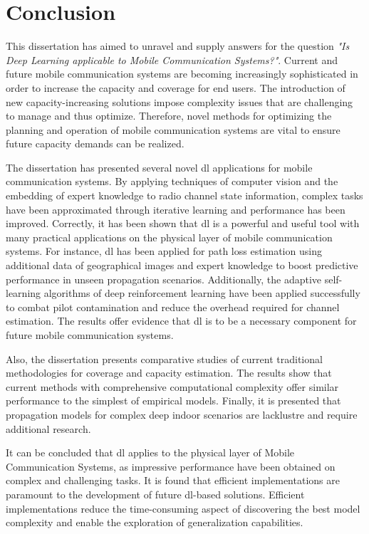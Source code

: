 \chapter{Conclusion}\label{ch:conclusion}

This dissertation has aimed to unravel and supply answers for the question \emph{"Is Deep Learning applicable to Mobile Communication Systems?"}. Current and future mobile communication systems are becoming increasingly sophisticated in order to increase the capacity and coverage for end users. The introduction of new capacity-increasing solutions impose complexity issues that are challenging to manage and thus optimize. Therefore, novel methods for optimizing the planning and operation of mobile communication systems are vital to ensure future capacity demands can be realized.

The dissertation has presented several novel \acrlong{dl} applications for mobile communication systems. By applying techniques of computer vision and the embedding of expert knowledge to radio channel state information, complex tasks have been approximated through iterative learning and performance has been improved. Correctly, it has been shown that \acrlong{dl} is a powerful and useful tool with many practical applications on the physical layer of mobile communication systems. For instance, \acrlong{dl} has been applied for path loss estimation using additional data of geographical images and expert knowledge to boost predictive performance in unseen propagation scenarios. Additionally, the adaptive self-learning algorithms of deep reinforcement learning have been applied successfully to combat pilot contamination and reduce the overhead required for channel estimation. The results offer evidence that \acrlong{dl} is to be a necessary component for future mobile communication systems.

Also, the dissertation presents comparative studies of current traditional methodologies for coverage and capacity estimation. The results show that current methods with comprehensive computational complexity offer similar performance to the simplest of empirical models. Finally, it is presented that propagation models for complex deep indoor scenarios are lacklustre and require additional research.

It can be concluded that \acrlong{dl} applies to the physical layer of Mobile Communication Systems, as impressive performance have been obtained on complex and challenging tasks. It is found that efficient implementations are paramount to the development of future \acrlong{dl}-based solutions. Efficient implementations reduce the time-consuming aspect of discovering the best model complexity and enable the exploration of generalization capabilities. 


